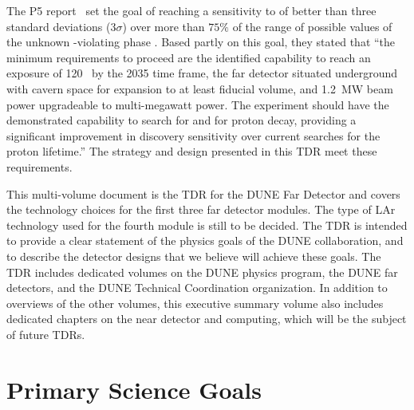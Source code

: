The P5 report~\cite{p5report} set the goal of reaching a sensitivity to  of better than three standard deviations (\num{3}$\sigma$) over more than $75\%$ 
of the range of possible values of the unknown -violating phase \deltacp.
Based partly on this goal, they stated that ``the 
minimum requirements to proceed are the identified capability to reach an exposure 
of \num{120}~\ktMWyr{} by the 2035 time frame, the far detector situated underground 
with cavern space for expansion to at least \fdfiducialmass \lar fiducial volume, and \SI{1.2}{MW} 
beam power upgradeable to multi-megawatt power.
The experiment should have the demonstrated 
capability to search for  and for proton decay, providing a significant 
improvement in discovery sensitivity over current searches for the proton lifetime.'' The strategy and design presented in this TDR meet these requirements.

This multi-volume document is the TDR for the DUNE Far Detector and covers the technology choices for the first three far detector modules. The type of LAr 
technology used for the fourth module is still to be decided. The TDR is intended to provide a clear statement of the physics goals of the DUNE collaboration, and to describe the detector designs that we believe will achieve these goals. The TDR includes dedicated volumes on the DUNE physics program, the DUNE far detectors, and the DUNE Technical Coordination organization. In addition to overviews of the other volumes, this executive summary volume also includes dedicated chapters on the near detector and computing, which will be the subject of future TDRs.

\section{Primary Science Goals}


